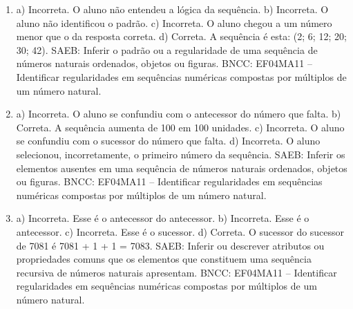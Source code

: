 \begin{enumerate}
\item
a) Incorreta. O aluno não entendeu a lógica da sequência.
b) Incorreta. O aluno não identificou o padrão.
c) Incorreta. O aluno chegou a um número menor que o da resposta correta.
d) Correta. A sequência é esta: (2; 6; 12; 20; 30; 42).
SAEB: Inferir o padrão ou a regularidade de uma sequência de números naturais ordenados, objetos ou figuras.
BNCC: EF04MA11 -- Identificar regularidades em sequências numéricas compostas por múltiplos de um
número natural.

\item
a) Incorreta. O aluno se confundiu com o antecessor do número que falta.
b) Correta. A sequência aumenta de 100 em 100 unidades.
c) Incorreta. O aluno se confundiu com o sucessor do número que falta.
d) Incorreta. O aluno selecionou, incorretamente, o primeiro número da sequência.
SAEB: Inferir os elementos ausentes em uma sequência de números naturais ordenados, objetos ou figuras.
BNCC: EF04MA11 -- Identificar regularidades em sequências numéricas compostas por múltiplos de um
número natural.

\item
a) Incorreta. Esse é o antecessor do antecessor.
b) Incorreta. Esse é o antecessor.
c) Incorreta. Esse é o sucessor.
d) Correta. O sucessor do sucessor de 7081 é 7081 + 1 + 1 = 7083.
SAEB: Inferir ou descrever atributos ou propriedades comuns que os elementos que constituem uma sequência recursiva de números naturais apresentam.
BNCC: EF04MA11 -- Identificar regularidades em sequências numéricas compostas por múltiplos de um
número natural.
\end{enumerate}


